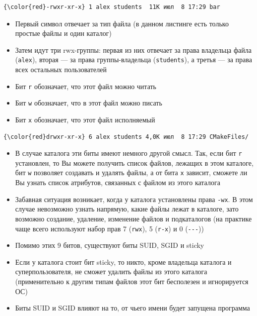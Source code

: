 \documentclass{beamer}
\begin{document}
\begin{frame}[fragile]
	\begin{Verbatim}[commandchars=\\\{\},codes={\catcode`$=3\catcode`^=7\catcode`_=8}]
{\color{red}-rwxr-xr-x} 1 alex students  11K июл  8 17:29 bar
	\end{Verbatim}
	\begin{itemize}
		\item{Первый символ отвечает за тип файла (в данном листинге есть только простые файлы и один каталог)}\pause
		\item{Затем идут три rwx-группы: первая из них отвечает за права владельца файла (\texttt{alex}), вторая --- за права группы-владельца (\texttt{students}), а третья --- за права всех остальных пользователей}\pause
		\item{Бит \texttt{r} обозначает, что этот файл можно читать}\pause
		\item{Бит \texttt{w} обозначает, что в этот файл можно писать}\pause
		\item{Бит \texttt{x} обозначает, что этот файл исполняемый}
	\end{itemize}
\end{frame}

\begin{frame}[fragile]
	\begin{Verbatim}[commandchars=\\\{\},codes={\catcode`$=3\catcode`^=7\catcode`_=8}]
{\color{red}drwxr-xr-x} 6 alex students 4,0K июл  8 17:29 CMakeFiles/
	\end{Verbatim}
	\begin{itemize}
		\item{В случае каталога эти биты имеют немного другой смысл. Так, если бит \texttt{r} установлен, то Вы можете получить список файлов, лежащих в этом каталоге, бит \texttt{w} позволяет создавать и удалять файлы, а от бита \texttt{x} зависит, сможете ли Вы узнать список атрибутов, связанных с файлом из этого каталога}\pause
		\item{Забавная ситуация возникает, когда у каталога установлены права \texttt{-wx}. В этом случае невозможно узнать напрямую, какие файлы лежат в каталоге, зато возможно создание, удаление, изменение файлов и подкаталогов (на практике чаще всего используют набор прав 7 (\texttt{rwx}), 5 (\texttt{r-x}) и 0 (\texttt{-{}-{}-}))}
	\end{itemize}
\end{frame}

\begin{frame}
	\begin{itemize}
		\item{Помимо этих 9 битов, существуют биты SUID, SGID и sticky}\pause
		\item{Если у каталога стоит бит sticky, то никто, кроме владельца каталога и суперпользователя, не сможет удалить файлы из этого каталога (применительно к другим типам файлов этот бит бесполезен и игнорируется ОС)}\pause
		\item{Биты SUID и SGID влияют на то, от чьего имени будет запущена программа}
	\end{itemize}
\end{frame}
\end{document}
